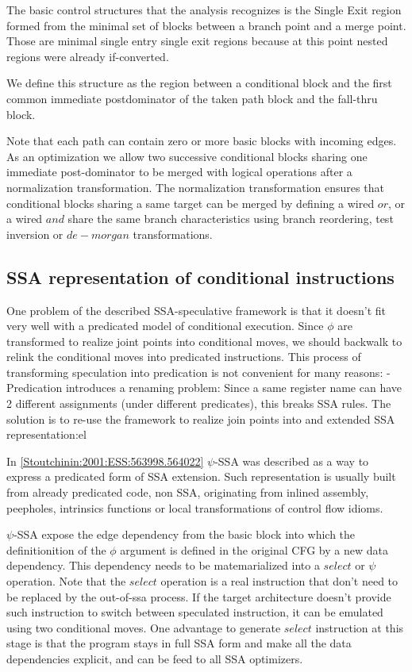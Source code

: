 The basic control structures that the analysis recognizes is the Single Exit region formed from the minimal set of blocks between a branch point and a merge point.  Those are minimal single entry single exit regions because at this point nested regions were already if-converted.

 We define this structure as the region between a conditional block and the first common immediate postdominator of the taken path block and the fall-thru block.

Note that each path can contain zero or more basic blocks with incoming edges.
As an optimization we allow two successive conditional blocks sharing one immediate post-dominator to be merged with logical operations after a normalization transformation. The normalization transformation ensures that conditional blocks sharing a same target can be merged by defining a wired $or$, or a wired $and$ share the same branch characteristics using branch reordering, test inversion or $de-morgan$ transformations.

\subsection{SSA representation of conditional instructions}

One problem of the described SSA-speculative framework is that it doesn't fit very well with a predicated model of conditional execution. Since $\phi$ are transformed to realize joint points into conditional moves, we should backwalk to relink the conditional moves into predicated instructions. This process of transforming speculation into predication is not convenient for many reasons:
- Predication introduces a renaming problem: Since a same register name can have 2 different assignments (under different predicates), this breaks SSA rules. The solution is to re-use the framework to realize join points into and extended SSA representation:el

In \ref{Stoutchinin:2001:ESS:563998.564022} $\psi$-SSA was described as a way to express a predicated form of SSA extension. Such representation is usually built from already predicated code, non SSA, originating from inlined assembly, peepholes, intrinsics functions or local transformations of control flow idioms. 

$\psi$-SSA expose the edge dependency from the basic block into which the definitionition of the $\phi$ argument is defined in the original CFG by a new data dependency. This dependency needs to be matemarialized into a $select$ or $\psi$ operation. Note that the $select$ operation is a real instruction that don't need to be replaced by the out-of-ssa process. If the target architecture doesn't provide such instruction to switch between speculated instruction, it can be emulated using two conditional moves. One advantage to generate $select$ instruction at this stage is that the program stays in full SSA form and make all the data dependencies explicit, and can be feed to all SSA optimizers. 

